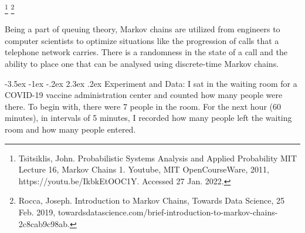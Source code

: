 \documentclass[11pt]{article}
\makeatletter
\renewcommand\section{\@startsection {section}{1}{\z@}%
                                       {-3.5ex \@plus -1ex \@minus -.2ex}%
                                       {2.3ex \@plus.2ex}%
                                       {\normalfont\fontfamily{phv}\fontsize{16}{19}\bfseries}}
\makeatother
\begin{document}
\footnote{Tsitsiklis, John. Probabilistic Systems Analysis and Applied Probability MIT Lecture 16, Markov Chains 1. Youtube, MIT OpenCourseWare, 2011, https://youtu.be/IkbkEtOOC1Y. Accessed 27 Jan. 2022.}
\footnote{Rocca, Joseph. Introduction to Markov Chains, Towards Data Science, 25 Feb. 2019, towardsdatascience.com/brief-introduction-to-markov-chains-2c8cab9c98ab.}

Being a part of queuing theory, Markov chains are utilized from engineers to computer scientists to optimize situations like the progression of calls that a telephone network carries. There is a randomness in the state of a call and the ability to place one that can be analysed using discrete-time Markov chains. 




\section{Experiment and Data:}
I sat in the waiting room for a COVID-19 vaccine administration center and counted how many people were there. To begin with, there were 7 people in the room. For the next hour (60 minutes), in intervals of 5 minutes, I recorded how many people left the waiting room and how many people entered. 

\label{s:numerical}

    
\end{document}
